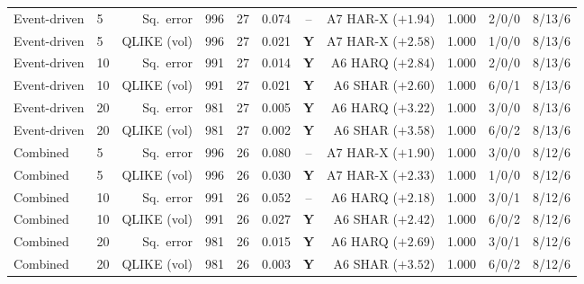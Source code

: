 \begin{table}[htbp]
\begin{tabular}{@{}llrrrrcrlrl@{}}
\addlinespace
Event-driven & 5 & Sq.\ error & 996 & 27 & 0.074 & -- & A7 HAR-X ($+1.94$) & 1.000 & 2/0/0 & 8/13/6 \\
Event-driven & 5 & QLIKE (vol) & 996 & 27 & 0.021 & \textbf{Y} & A7 HAR-X ($+2.58$) & 1.000 & 1/0/0 & 8/13/6 \\
Event-driven & 10 & Sq.\ error & 991 & 27 & 0.014 & \textbf{Y} & A6 HARQ ($+2.84$) & 1.000 & 2/0/0 & 8/13/6 \\
Event-driven & 10 & QLIKE (vol) & 991 & 27 & 0.021 & \textbf{Y} & A6 SHAR ($+2.60$) & 1.000 & 6/0/1 & 8/13/6 \\
Event-driven & 20 & Sq.\ error & 981 & 27 & 0.005 & \textbf{Y} & A6 HARQ ($+3.22$) & 1.000 & 3/0/0 & 8/13/6 \\
Event-driven & 20 & QLIKE (vol) & 981 & 27 & 0.002 & \textbf{Y} & A6 SHAR ($+3.58$) & 1.000 & 6/0/2 & 8/13/6 \\
\addlinespace
Combined & 5 & Sq.\ error & 996 & 26 & 0.080 & -- & A7 HAR-X ($+1.90$) & 1.000 & 3/0/0 & 8/12/6 \\
Combined & 5 & QLIKE (vol) & 996 & 26 & 0.030 & \textbf{Y} & A7 HAR-X ($+2.33$) & 1.000 & 1/0/0 & 8/12/6 \\
Combined & 10 & Sq.\ error & 991 & 26 & 0.052 & -- & A6 HARQ ($+2.18$) & 1.000 & 3/0/1 & 8/12/6 \\
Combined & 10 & QLIKE (vol) & 991 & 26 & 0.027 & \textbf{Y} & A6 SHAR ($+2.42$) & 1.000 & 6/0/2 & 8/12/6 \\
Combined & 20 & Sq.\ error & 981 & 26 & 0.015 & \textbf{Y} & A6 HARQ ($+2.69$) & 1.000 & 3/0/1 & 8/12/6 \\
Combined & 20 & QLIKE (vol) & 981 & 26 & 0.003 & \textbf{Y} & A6 SHAR ($+3.52$) & 1.000 & 6/0/2 & 8/12/6 \\
\bottomrule
\end{tabular}
\end{table}


